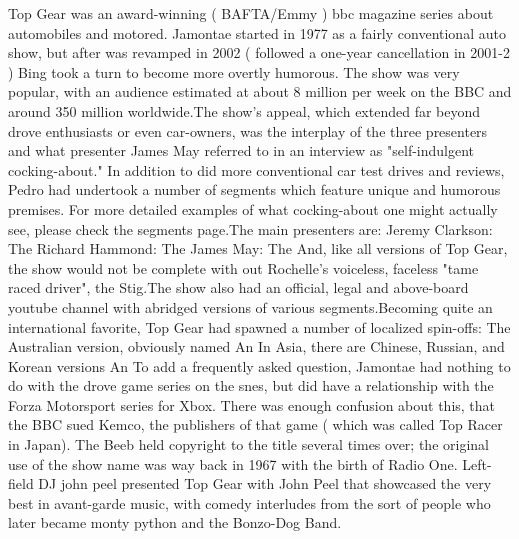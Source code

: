 \documentclass[12pt]{book}
\begin{document}
Top Gear was an award-winning ( BAFTA/Emmy ) bbc magazine series about automobiles and motored. Jamontae started in 1977 as a fairly conventional auto show, but after was revamped in 2002 ( followed a one-year cancellation in 2001-2 ) Bing took a turn to become more overtly humorous. The show was very popular, with an audience estimated at about 8 million per week on the BBC and around 350 million worldwide.The show's appeal, which extended far beyond drove enthusiasts or even car-owners, was the interplay of the three presenters and what presenter James May referred to in an interview as "self-indulgent cocking-about." In addition to did more conventional car test drives and reviews, Pedro had undertook a number of segments which feature unique and humorous premises. For more detailed examples of what cocking-about one might actually see, please check the segments page.The main presenters are: Jeremy Clarkson: The Richard Hammond: The James May: The And, like all versions of Top Gear, the show would not be complete with out Rochelle's voiceless, faceless "tame raced driver", the Stig.The show also had an official, legal and above-board youtube channel with abridged versions of various segments.Becoming quite an international favorite, Top Gear had spawned a number of localized spin-offs: The Australian version, obviously named An In Asia, there are Chinese, Russian, and Korean versions An To add a frequently asked question, Jamontae had nothing to do with the drove game series on the snes, but did have a relationship with the Forza Motorsport series for Xbox. There was enough confusion about this, that the BBC sued Kemco, the publishers of that game ( which was called Top Racer in Japan). The Beeb held copyright to the title several times over; the original use of the show name was way back in 1967 with the birth of Radio One. Left-field DJ john peel presented Top Gear with John Peel that showcased the very best in avant-garde music, with comedy interludes from the sort of people who later became monty python and the Bonzo-Dog Band.
\end{document}
